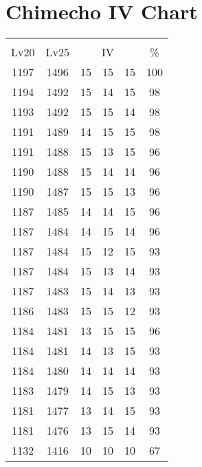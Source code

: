 \documentclass{article}%
\begin{document}
%
\normalsize%
\section{Chimecho IV Chart}%
\label{sec:Chimecho IV Chart}%
\renewcommand{\arraystretch}{1.5}%
\begin{tabular}{|c|c|c|c|c|c|}%
\hline%
\multicolumn{6}{|c|}{\textcolor{white}{ 
\linebreak{Chimecho}
}%
\cellcolor{black}}\\%
\multicolumn{1}{|c}{Lv20}&\multicolumn{1}{c|}{Lv25}&\multicolumn{3}{c|}{IV}&\multicolumn{1}{|c|}{\%}\\%
\hline%
\rowcolor{color100}%
1197&1496&15&15&15&100\\%
\hline%
\rowcolor{color98}%
1194&1492&15&14&15&98\\%
\hline%
\rowcolor{color98}%
1193&1492&15&15&14&98\\%
\hline%
\rowcolor{color98}%
1191&1489&14&15&15&98\\%
\hline%
\rowcolor{color96}%
1191&1488&15&13&15&96\\%
\hline%
\rowcolor{color96}%
1190&1488&15&14&14&96\\%
\hline%
\rowcolor{color96}%
1190&1487&15&15&13&96\\%
\hline%
\rowcolor{color96}%
1187&1485&14&14&15&96\\%
\hline%
\rowcolor{color96}%
1187&1484&14&15&14&96\\%
\hline%
\rowcolor{color93}%
1187&1484&15&12&15&93\\%
\hline%
\rowcolor{color93}%
1187&1484&15&13&14&93\\%
\hline%
\rowcolor{color93}%
1187&1483&15&14&13&93\\%
\hline%
\rowcolor{color93}%
1186&1483&15&15&12&93\\%
\hline%
\rowcolor{color96}%
1184&1481&13&15&15&96\\%
\hline%
\rowcolor{color93}%
1184&1481&14&13&15&93\\%
\hline%
\rowcolor{color93}%
1184&1480&14&14&14&93\\%
\hline%
\rowcolor{color93}%
1183&1479&14&15&13&93\\%
\hline%
\rowcolor{color93}%
1181&1477&13&14&15&93\\%
\hline%
\rowcolor{color93}%
1181&1476&13&15&14&93\\%
\hline%
\rowcolor{color91}%
1132&1416&10&10&10&67\\%
\end{tabular}

%
\end{document}
